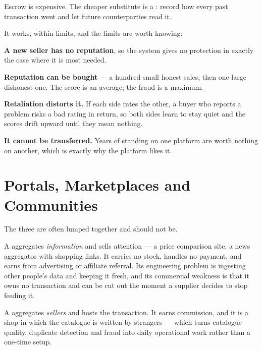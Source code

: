 \begin{examplebox}
Escrow is expensive. The cheaper substitute is a :
record how every past transaction went and let future counterparties read it.

\smallskip
It works, within limits, and the limits are worth knowing:

\begin{tight}
  \item \textbf{A new seller has no reputation}, so the system gives no
        protection in exactly the case where it is most needed.
  \item \textbf{Reputation can be bought} --- a hundred small honest sales, then
        one large dishonest one. The score is an average; the fraud is a
        maximum.
  \item \textbf{Retaliation distorts it.} If each side rates the other, a buyer
        who reports a problem risks a bad rating in return, so both sides learn
        to stay quiet and the scores drift upward until they mean nothing.
  \item \textbf{It cannot be transferred.} Years of standing on one platform are
        worth nothing on another, which is exactly why the platform likes it.
\end{tight}
\end{examplebox}

\section{Portals, Marketplaces and Communities}

The three are often lumped together and should not be.

A  aggregates \emph{information} and sells attention --- a price
comparison site, a news aggregator with shopping links. It carries no stock,
handles no payment, and earns from advertising or affiliate referral. Its
engineering problem is ingesting other people's data and keeping it fresh, and
its commercial weakness is that it owns no transaction and can be cut out the
moment a supplier decides to stop feeding it.

A  aggregates \emph{sellers} and hosts the transaction. It
earns commission, and it is a shop in which the catalogue is written by
strangers --- which turns catalogue quality, duplicate detection and fraud into
daily operational work rather than a one-time setup.

